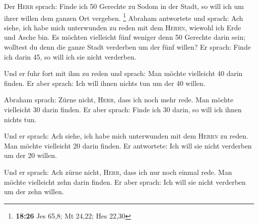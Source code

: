  Der \textsc{Herr} sprach: Finde ich 50 Gerechte zu Sodom
in der Stadt, so will ich um ihrer willen dem ganzen Ort vergeben.
\footnote{\textbf{18:26} Jes 65,8; Mt 24,22; Hes 22,30} 
Abraham antwortete und sprach: Ach siehe, ich habe mich unterwunden zu
reden mit dem \textsc{Herrn}, wiewohl ich Erde und Asche bin.
 Es möchten vielleicht fünf weniger denn 50 Gerechte
darin sein; wolltest du denn die ganze Stadt verderben um der fünf
willen? Er sprach: Finde ich darin 45, so will ich sie nicht verderben.

 Und er fuhr fort mit ihm zu reden und sprach: Man möchte
vielleicht 40 darin finden. Er aber sprach: Ich will ihnen nichts tun um
der 40 willen.

 Abraham sprach: Zürne nicht, \textsc{Herr}, dass ich
noch mehr rede. Man möchte vielleicht 30 darin finden. Er aber sprach:
Finde ich 30 darin, so will ich ihnen nichts tun.

 Und er sprach: Ach siehe, ich habe mich unterwunden mit
dem \textsc{Herrn} zu reden. Man möchte vielleicht 20 darin finden. Er
antwortete: Ich will sie nicht verderben um der 20 willen.

 Und er sprach: Ach zürne nicht, \textsc{Herr}, dass ich
nur noch einmal rede. Man möchte vielleicht zehn darin finden. Er aber
sprach: Ich will sie nicht verderben um der zehn willen.

